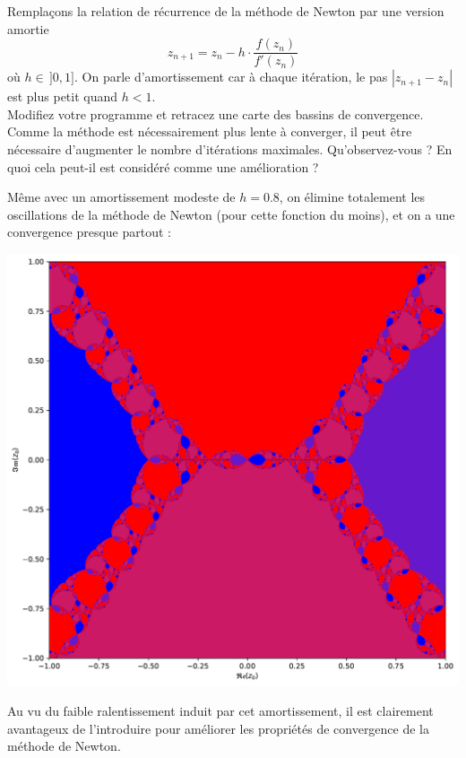 \documentclass{book}
\begin{document}
Remplaçons la relation de récurrence de la méthode de Newton par une version amortie
\begin{equation*}
z_{n+1} = z_n - h\cdot\frac{f(z_n)}{f'(z_n)}
\end{equation*}
où $h\in\,]0,1]$. On parle d'amortissement car à chaque itération, le pas $|z_{n+1}-z_n|$ est plus petit quand $h<1$.\\

Modifiez votre programme et retracez une carte des bassins de convergence. Comme la méthode est nécessairement plus lente à converger, il peut être nécessaire d'augmenter le nombre d'itérations maximales. Qu'observez-vous ? En quoi cela peut-il est considéré comme une amélioration ?

\begin{correction}
Même avec un amortissement modeste de $h=0.8$, on élimine totalement les oscillations de la méthode de Newton (pour cette fonction du moins), et on a une convergence presque partout :
\begin{center}
\includegraphics[width=0.7\linewidth]{TD2/newton_bassins_converg_z4_2z2_1.h08.pdf}
\end{center}
Au vu du faible ralentissement induit par cet amortissement, il est clairement avantageux de l'introduire pour améliorer les propriétés de convergence de la méthode de Newton.\\


\end{correction}
\end{document}
